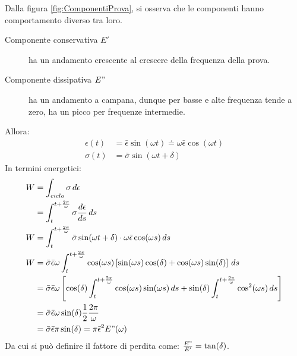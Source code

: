 Dalla figura \ref{fig:ComponentiProva}, si osserva che le componenti hanno comportamento diverso tra loro.
\begin{description}
\item[Componente conservativa $E'$] ha un andamento crescente al crescere della frequenza della prova.
\item[Componente dissipativa $E"$] ha un andamento a campana, dunque per basse e alte frequenza tende a zero, ha un picco per frequenze intermedie.
\end{description}

Allora:
\begin{equation}
\begin{split}
\epsilon(t) &= \bar{\epsilon}\sin(\omega t) \doteq \omega \bar{\epsilon}\cos(\omega t)\\
\sigma(t) &= \bar{\sigma}\sin(\omega t + \delta)
\end{split}
\end{equation}
In termini energetici:
\begin{equation}
\begin{split}
W &= \int_{ciclo}\sigma\,d\epsilon\\
&= \int_t^{t+\frac{2\pi}{\omega}}{\sigma \frac{d\epsilon}{ds}\,ds}\\
W &= \int_t^{t+\frac{2\pi}{\omega}}{\bar{\sigma}\sin(\omega t + \delta) \cdot \omega \bar{\epsilon}\cos(\omega s)\,ds}\\
W &= \bar{\sigma} \bar{\epsilon}\omega\int_t^{t+\frac{2\pi}{\omega}}{\cos(\omega s)\left[\sin(\omega s)\cos(\delta) + \cos(\omega s)\sin(\delta)\right]\,ds}\\
&= \bar{\sigma}\bar{\epsilon}\omega\left[\cos(\delta)\int_t^{t+\frac{2\pi}{\omega}}{\cos(\omega s)\sin(\omega s)\,ds} + \sin(\delta)\int_t^{t+\frac{2\pi}{\omega}}{\cos^2(\omega s)\,ds}\right]\\
&=\bar{\sigma}\bar{\epsilon}\omega\sin(\delta)\frac{1}{2}\frac{2\pi}{\omega}\\
&= \bar{\sigma}\bar{\epsilon}\pi\sin(\delta) = \pi \bar{\epsilon}^2E"(\omega)
\end{split}
\end{equation}
Da cui si può definire il fattore di perdita come: $\frac{E"}{E'} = \tan(\delta)$.

